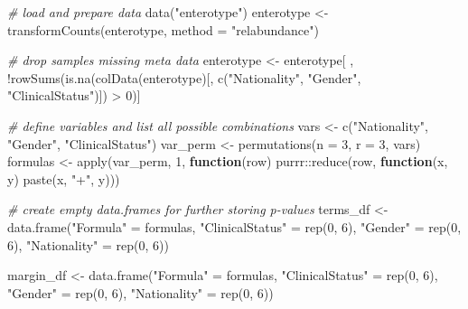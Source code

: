 \documentclass[
]{book}
\newenvironment{Shaded}{\begin{snugshade}}{\end{snugshade}}
\newcommand{\AttributeTok}[1]{\textcolor[rgb]{0.77,0.63,0.00}{#1}}
\newcommand{\CommentTok}[1]{\textcolor[rgb]{0.56,0.35,0.01}{\textit{#1}}}
\newcommand{\ControlFlowTok}[1]{\textcolor[rgb]{0.13,0.29,0.53}{\textbf{#1}}}
\newcommand{\DecValTok}[1]{\textcolor[rgb]{0.00,0.00,0.81}{#1}}
\newcommand{\FunctionTok}[1]{\textcolor[rgb]{0.00,0.00,0.00}{#1}}
\newcommand{\NormalTok}[1]{#1}
\newcommand{\OtherTok}[1]{\textcolor[rgb]{0.56,0.35,0.01}{#1}}
\newcommand{\SpecialCharTok}[1]{\textcolor[rgb]{0.00,0.00,0.00}{#1}}
\newcommand{\StringTok}[1]{\textcolor[rgb]{0.31,0.60,0.02}{#1}}
\begin{document}
\begin{Shaded}
\begin{Highlighting}[]
\CommentTok{\# load and prepare data}
\FunctionTok{data}\NormalTok{(}\StringTok{"enterotype"}\NormalTok{)}
\NormalTok{enterotype }\OtherTok{\textless{}{-}} \FunctionTok{transformCounts}\NormalTok{(enterotype, }\AttributeTok{method =} \StringTok{"relabundance"}\NormalTok{)}

\CommentTok{\# drop samples missing meta data}
\NormalTok{enterotype }\OtherTok{\textless{}{-}}\NormalTok{ enterotype[ , }\SpecialCharTok{!}\FunctionTok{rowSums}\NormalTok{(}\FunctionTok{is.na}\NormalTok{(}\FunctionTok{colData}\NormalTok{(enterotype)[, }\FunctionTok{c}\NormalTok{(}\StringTok{"Nationality"}\NormalTok{, }\StringTok{"Gender"}\NormalTok{, }\StringTok{"ClinicalStatus"}\NormalTok{)]) }\SpecialCharTok{\textgreater{}} \DecValTok{0}\NormalTok{)]}

\CommentTok{\# define variables and list all possible combinations}
\NormalTok{vars }\OtherTok{\textless{}{-}} \FunctionTok{c}\NormalTok{(}\StringTok{"Nationality"}\NormalTok{, }\StringTok{"Gender"}\NormalTok{, }\StringTok{"ClinicalStatus"}\NormalTok{)}
\NormalTok{var\_perm }\OtherTok{\textless{}{-}} \FunctionTok{permutations}\NormalTok{(}\AttributeTok{n =} \DecValTok{3}\NormalTok{, }\AttributeTok{r =} \DecValTok{3}\NormalTok{, vars)}
\NormalTok{formulas }\OtherTok{\textless{}{-}} \FunctionTok{apply}\NormalTok{(var\_perm, }\DecValTok{1}\NormalTok{, }\ControlFlowTok{function}\NormalTok{(row) purrr}\SpecialCharTok{::}\FunctionTok{reduce}\NormalTok{(row, }\ControlFlowTok{function}\NormalTok{(x, y) }\FunctionTok{paste}\NormalTok{(x, }\StringTok{"+"}\NormalTok{, y)))}

\CommentTok{\# create empty data.frames for further storing p{-}values}
\NormalTok{terms\_df }\OtherTok{\textless{}{-}} \FunctionTok{data.frame}\NormalTok{(}\StringTok{"Formula"} \OtherTok{=}\NormalTok{ formulas,}
                       \StringTok{"ClinicalStatus"} \OtherTok{=} \FunctionTok{rep}\NormalTok{(}\DecValTok{0}\NormalTok{, }\DecValTok{6}\NormalTok{),}
                       \StringTok{"Gender"} \OtherTok{=} \FunctionTok{rep}\NormalTok{(}\DecValTok{0}\NormalTok{, }\DecValTok{6}\NormalTok{),}
                       \StringTok{"Nationality"} \OtherTok{=} \FunctionTok{rep}\NormalTok{(}\DecValTok{0}\NormalTok{, }\DecValTok{6}\NormalTok{))}

\NormalTok{margin\_df }\OtherTok{\textless{}{-}} \FunctionTok{data.frame}\NormalTok{(}\StringTok{"Formula"} \OtherTok{=}\NormalTok{ formulas,}
                        \StringTok{"ClinicalStatus"} \OtherTok{=} \FunctionTok{rep}\NormalTok{(}\DecValTok{0}\NormalTok{, }\DecValTok{6}\NormalTok{),}
                        \StringTok{"Gender"} \OtherTok{=} \FunctionTok{rep}\NormalTok{(}\DecValTok{0}\NormalTok{, }\DecValTok{6}\NormalTok{),}
                        \StringTok{"Nationality"} \OtherTok{=} \FunctionTok{rep}\NormalTok{(}\DecValTok{0}\NormalTok{, }\DecValTok{6}\NormalTok{))}
\end{Highlighting}
\end{Shaded}
\end{document}
